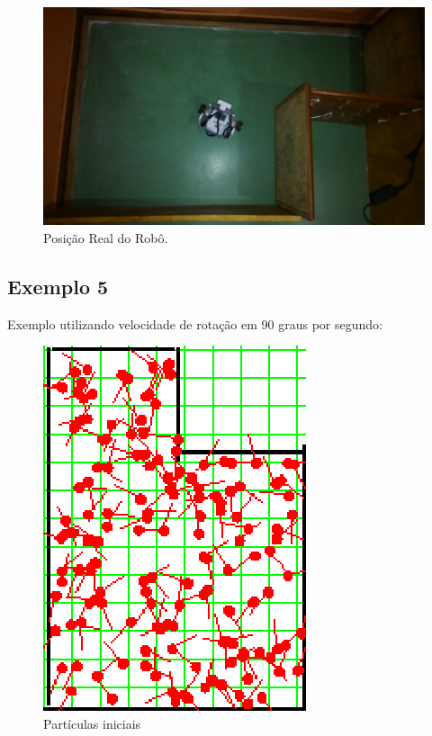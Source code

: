 \begin{figure}[H]
  \centering
  \includegraphics[scale=0.8]{figuras/cen2_ex4/real.eps}
  \caption[Posição real do Robô]{Posição Real do Robô.}
  \label{img:cen2_ex4_6}
\end{figure}

\subsection{Exemplo 5}

Exemplo utilizando velocidade de rotação em 90 graus por segundo:

\begin{figure}[H]
  \centering
  \includegraphics[scale=1]{figuras/cen2_ex5/1.eps}
  \caption[Partículas Iniciais]{Partículas iniciais}
  \label{img:cen2_ex5_1}
\end{figure}

